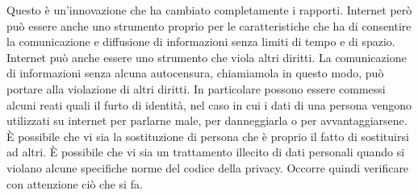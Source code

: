 Questo è un'innovazione che ha cambiato completamente i rapporti. Internet però può essere anche uno strumento proprio per le caratteristiche che ha di consentire la comunicazione e diffusione di informazioni senza limiti di tempo e di spazio. Internet può anche essere uno strumento che viola altri diritti. La comunicazione di informazioni senza alcuna autocensura, chiamiamola in questo modo, può portare alla violazione di altri diritti. In particolare possono essere commessi alcuni reati quali il furto di identità, nel caso in cui i dati di una persona vengono utilizzati su internet per parlarne male, per danneggiarla o per avvantaggiarsene. È possibile che vi sia la sostituzione di persona che è proprio il fatto di sostituirsi ad altri. È possibile che vi sia un trattamento illecito di dati personali quando si violano alcune specifiche norme del codice della privacy. Occorre quindi verificare con attenzione ciò che si fa.